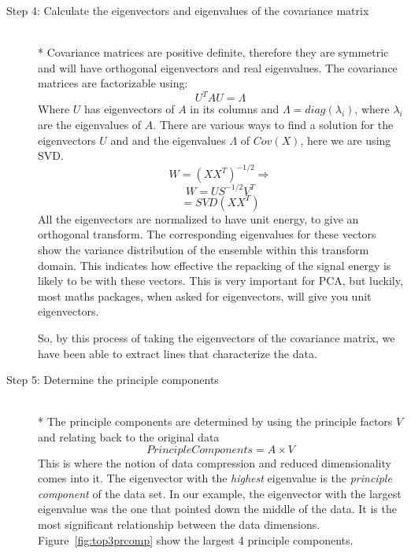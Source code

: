 \documentclass[paper=letter, fontsize=11pt, onecolunm, twoside]{scrartcl}
\begin{document}
\begin{description}
\item[Step 4: Calculate the eigenvectors and eigenvalues of the
covariance matrix] ~\\*
Covariance matrices are positive definite, therefore they are 
symmetric and will have orthogonal eigenvectors and real eigenvalues.
The covariance matrices are factorizable using:
\begin{equation}
U^T A U = \Lambda
\end{equation}
Where $U$ has eigenvectors of $A$ in its columns and
$\Lambda=diag(\lambda_i)$, where $\lambda_i$ are  the eigenvalues of
$A$.  There are various ways to find a solution for the eigenvectors
$U$ and and the eigenvalues $\Lambda$ of $Cov(X)$, here we are using
\ac{SVD}.
\begin{equation}
W = (XX^T)^{-1/2} \Rightarrow
\end{equation}
\begin{equation}
W = U S^{-1/2}V^T
\end{equation}
\begin{equation}
[U, S, V] = SVD(XX^T)
\end{equation}
All the eigenvectors are normalized to have unit energy, to give an
orthogonal transform. The corresponding eigenvalues for these vectors
show the variance distribution of the ensemble within this transform
domain. This indicates how effective the repacking of the signal
energy is likely to be with these vectors.  This is very important for
PCA, but luckily, most maths packages, when asked for eigenvectors,
will give you unit eigenvectors.

So, by this process of taking the eigenvectors of the covariance
matrix, we have been able to extract lines that characterize the data.

\item[Step 5: Determine the principle components] ~\\*
The principle components are determined by using the principle factors
$V$ and relating back to the original data
\begin{equation}
PrincipleComponents = A \times V
\end{equation}
This is where the notion of data compression and reduced
dimensionality comes into it. The eigenvector with the \emph{highest}
eigenvalue is the \emph{principle component} of the data set.  In our
example, the eigenvector with the largest eigenvalue was the one that
pointed down the middle of the data. It is the most significant
relationship between the data dimensions. Figure~\ref{fig:top3prcomp}
show the largest 4 principle components.


\end{description}
\end{document}
